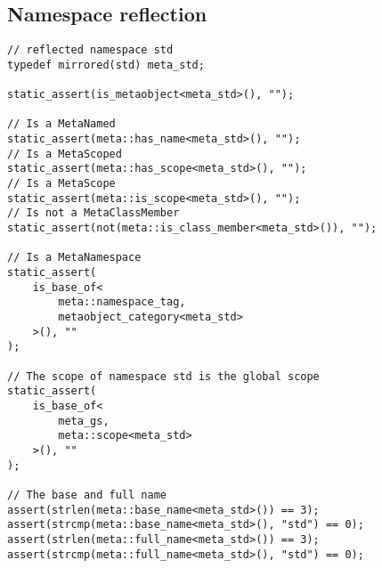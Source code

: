 \subsection{Namespace reflection}

\begin{verbatim}
// reflected namespace std
typedef mirrored(std) meta_std;

static_assert(is_metaobject<meta_std>(), "");

// Is a MetaNamed
static_assert(meta::has_name<meta_std>(), "");
// Is a MetaScoped
static_assert(meta::has_scope<meta_std>(), "");
// Is a MetaScope
static_assert(meta::is_scope<meta_std>(), "");
// Is not a MetaClassMember
static_assert(not(meta::is_class_member<meta_std>()), "");

// Is a MetaNamespace
static_assert(
	is_base_of<
		meta::namespace_tag,
		metaobject_category<meta_std>
	>(), ""
);

// The scope of namespace std is the global scope
static_assert(
	is_base_of<
		meta_gs,
		meta::scope<meta_std>
	>(), ""
);

// The base and full name
assert(strlen(meta::base_name<meta_std>()) == 3);
assert(strcmp(meta::base_name<meta_std>(), "std") == 0);
assert(strlen(meta::full_name<meta_std>()) == 3);
assert(strcmp(meta::full_name<meta_std>(), "std") == 0);
\end{verbatim}
